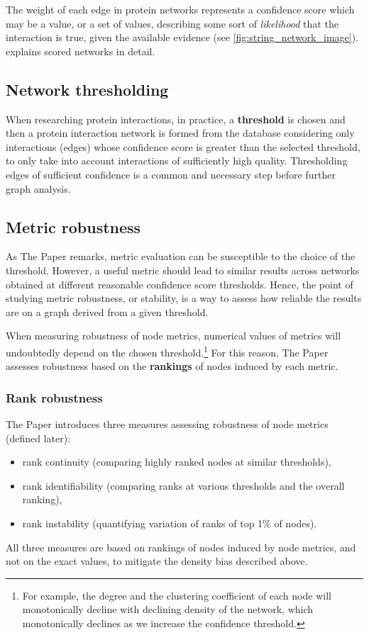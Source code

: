 


The weight of each edge in protein networks represents a confidence score which may be a value, or a set of values, describing some sort of \textsl{likelihood} that the interaction is true, given the available evidence (see \cref{fig:string_network_image}).
 explains scored networks in detail.

\subsection{Network thresholding}

When researching protein interactions, in practice, a \textbf{threshold} is chosen and then a protein interaction network is formed from the database considering only interactions (edges) whose confidence score is greater than the selected threshold, to only take into account interactions of sufficiently high quality.
Thresholding edges of sufficient confidence is a common and necessary step before further graph analysis.

\subsection{Metric robustness}

As The Paper remarks, metric evaluation can be susceptible to the choice of the threshold.
However, a useful metric should lead to similar results across networks obtained at different reasonable confidence score thresholds.
Hence, the point of studying metric robustness, or stability, is a way to assess how reliable the results are on a graph derived from a given threshold.

When measuring robustness of node metrics, numerical values of metrics will undoubtedly depend on the chosen threshold.\footnote{For example, the degree and the clustering coefficient of each node will monotonically decline with declining density of the network, which monotonically declines as we increase the confidence threshold.}
For this reason, The Paper assesses robustness based on the \textbf{rankings} of nodes induced by each metric.

\subsubsection*{Rank robustness}

The Paper introduces three measures assessing robustness of node metrics (defined later):
\begin{itemize}[topsep=5pt]
    \item rank continuity (comparing highly ranked nodes at similar thresholds),
    \item rank identifiability (comparing ranks at various thresholds and the overall ranking),
    \item rank instability (quantifying variation of ranks of top 1\% of nodes).
\end{itemize}
All three measures are based on rankings of nodes induced by node metrics, and not on the exact values, to mitigate the density bias described above.


